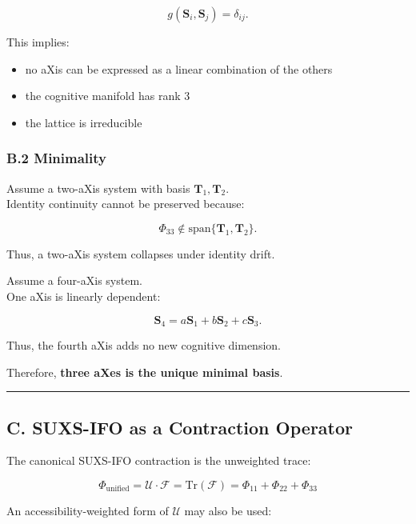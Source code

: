 \[
g(\mathbf{S}_i, \mathbf{S}_j) = \delta_{ij}.
\]

This implies:

\begin{itemize}
\tightlist
\item
  no aXis can be expressed as a linear combination of the others\\
\item
  the cognitive manifold has rank 3\\
\item
  the lattice is irreducible
\end{itemize}

\subsubsection{B.2 Minimality}\label{b.2-minimality}

Assume a two-aXis system with basis \(\mathbf{T}_1, \mathbf{T}_2\).\\
Identity continuity cannot be preserved because:

\[
\Phi_{33} \notin \text{span}\{\mathbf{T}_1, \mathbf{T}_2\}.
\]

Thus, a two-aXis system collapses under identity drift.

Assume a four-aXis system.\\
One aXis is linearly dependent:

\[
\mathbf{S}_4 = a\mathbf{S}_1 + b\mathbf{S}_2 + c\mathbf{S}_3.
\]

Thus, the fourth aXis adds no new cognitive dimension.

Therefore, \textbf{three aXes is the unique minimal basis}.

\begin{center}\rule{0.5\linewidth}{0.5pt}\end{center}

\subsection{C. SUXS-IFO as a Contraction Operator}\label{c.-suxs-ifo-as-a-contraction-operator}

The canonical SUXS-IFO contraction is the unweighted trace:

\[
\Phi_{\mathrm{unified}}=\mathcal{U}\cdot\mathcal{F}=\mathrm{Tr}(\mathcal{F})=\Phi_{11}+\Phi_{22}+\Phi_{33}
\]

An accessibility-weighted form of \(\mathcal{U}\) may also be used:

